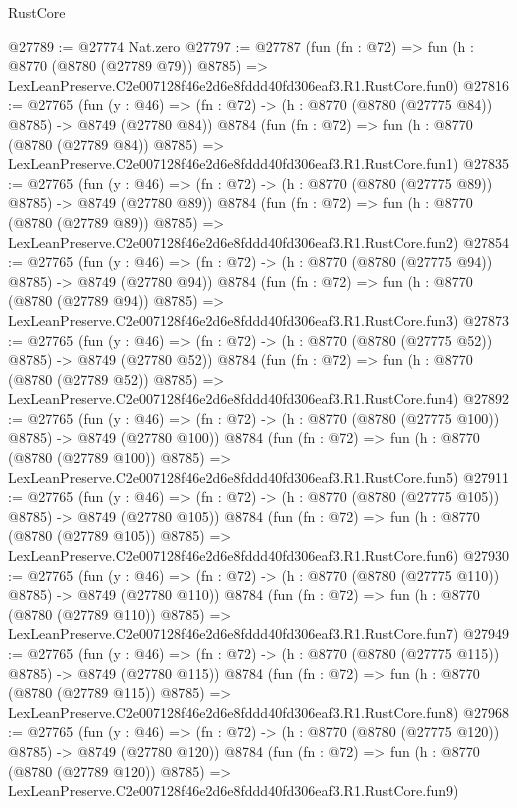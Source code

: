 \begin{lexlean}{RustCore}
\begin{coremodule}
@27789 := @27774 Nat.zero
@27797 := @27787
    (fun (fn : @72) =>
    fun (h : @8770 (@8780 (@27789 @79)) @8785) =>
    LexLeanPreserve.C2e007128f46e2d6e8fddd40fd306eaf3.R1.RustCore.fun0)
@27816 := @27765
    (fun (y : @46) => (fn : @72) -> (h : @8770 (@8780 (@27775 @84)) @8785) -> @8749 (@27780 @84))
    @8784
    (fun (fn : @72) =>
    fun (h : @8770 (@8780 (@27789 @84)) @8785) =>
    LexLeanPreserve.C2e007128f46e2d6e8fddd40fd306eaf3.R1.RustCore.fun1)
@27835 := @27765
    (fun (y : @46) => (fn : @72) -> (h : @8770 (@8780 (@27775 @89)) @8785) -> @8749 (@27780 @89))
    @8784
    (fun (fn : @72) =>
    fun (h : @8770 (@8780 (@27789 @89)) @8785) =>
    LexLeanPreserve.C2e007128f46e2d6e8fddd40fd306eaf3.R1.RustCore.fun2)
@27854 := @27765
    (fun (y : @46) => (fn : @72) -> (h : @8770 (@8780 (@27775 @94)) @8785) -> @8749 (@27780 @94))
    @8784
    (fun (fn : @72) =>
    fun (h : @8770 (@8780 (@27789 @94)) @8785) =>
    LexLeanPreserve.C2e007128f46e2d6e8fddd40fd306eaf3.R1.RustCore.fun3)
@27873 := @27765
    (fun (y : @46) => (fn : @72) -> (h : @8770 (@8780 (@27775 @52)) @8785) -> @8749 (@27780 @52))
    @8784
    (fun (fn : @72) =>
    fun (h : @8770 (@8780 (@27789 @52)) @8785) =>
    LexLeanPreserve.C2e007128f46e2d6e8fddd40fd306eaf3.R1.RustCore.fun4)
@27892 := @27765
    (fun (y : @46) => (fn : @72) -> (h : @8770 (@8780 (@27775 @100)) @8785) -> @8749 (@27780 @100))
    @8784
    (fun (fn : @72) =>
    fun (h : @8770 (@8780 (@27789 @100)) @8785) =>
    LexLeanPreserve.C2e007128f46e2d6e8fddd40fd306eaf3.R1.RustCore.fun5)
@27911 := @27765
    (fun (y : @46) => (fn : @72) -> (h : @8770 (@8780 (@27775 @105)) @8785) -> @8749 (@27780 @105))
    @8784
    (fun (fn : @72) =>
    fun (h : @8770 (@8780 (@27789 @105)) @8785) =>
    LexLeanPreserve.C2e007128f46e2d6e8fddd40fd306eaf3.R1.RustCore.fun6)
@27930 := @27765
    (fun (y : @46) => (fn : @72) -> (h : @8770 (@8780 (@27775 @110)) @8785) -> @8749 (@27780 @110))
    @8784
    (fun (fn : @72) =>
    fun (h : @8770 (@8780 (@27789 @110)) @8785) =>
    LexLeanPreserve.C2e007128f46e2d6e8fddd40fd306eaf3.R1.RustCore.fun7)
@27949 := @27765
    (fun (y : @46) => (fn : @72) -> (h : @8770 (@8780 (@27775 @115)) @8785) -> @8749 (@27780 @115))
    @8784
    (fun (fn : @72) =>
    fun (h : @8770 (@8780 (@27789 @115)) @8785) =>
    LexLeanPreserve.C2e007128f46e2d6e8fddd40fd306eaf3.R1.RustCore.fun8)
@27968 := @27765
    (fun (y : @46) => (fn : @72) -> (h : @8770 (@8780 (@27775 @120)) @8785) -> @8749 (@27780 @120))
    @8784
    (fun (fn : @72) =>
    fun (h : @8770 (@8780 (@27789 @120)) @8785) =>
    LexLeanPreserve.C2e007128f46e2d6e8fddd40fd306eaf3.R1.RustCore.fun9)

\end{coremodule}
\end{lexlean}
